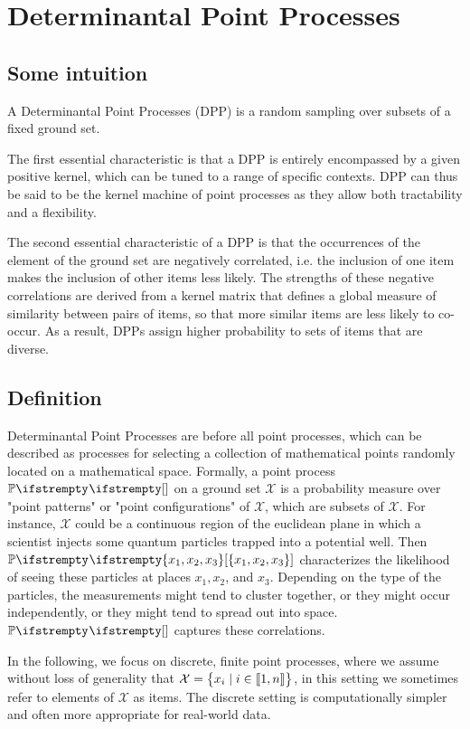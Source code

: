 \chapter{Determinantal Point Processes}

\section{Some intuition}

A Determinantal Point Processes (DPP) is a random sampling over subsets of a fixed ground set. 

The first essential characteristic is that a DPP is entirely encompassed by a given positive kernel, which can be tuned to a range of specific contexts. DPP can thus be said to be the kernel machine of point processes as they allow both tractability and a flexibility. 

The second essential characteristic of a DPP is that the occurrences of the element of the ground set are negatively correlated, i.e. the inclusion of one item
makes the inclusion of other items less likely. The strengths of these negative correlations are derived from a kernel matrix that defines a global measure of similarity between pairs of items, so that more similar items are less likely to co-occur. As a result, DPPs assign higher probability to sets of items that are diverse.




\section{Definition}
Determinantal Point Processes are before all point processes, which can be described as processes for selecting a collection of mathematical points randomly located on a mathematical space. Formally, a point process $\PP{}{}$ on a ground set $\mathcal{X}$ is a probability measure over "point patterns" or "point configurations" of $\mathcal{X}$, which are subsets of $\mathcal{X}$. For instance, $\mathcal{X}$ could be a continuous region of the euclidean plane in which a scientist injects some quantum particles trapped into a potential well. Then $\PP{}{\left\{x_1, x_2, x_3\right\}}$ characterizes the likelihood of seeing these particles at places $x_1, x_2$, and $x_3$. Depending on the type of the particles, the measurements might tend to cluster together, or they might occur independently, or they might tend to spread out into space. $\PP{}{}$ captures these correlations.

In the following, we focus on discrete, finite point processes, where we assume without loss of generality that $\mathcal{X}=\begin{Bmatrix}
    x_{i} \mid i\in \llbracket 1,n \rrbracket
    \end{Bmatrix}$, in this setting we sometimes refer to elements of $\mathcal{X}$ as items. The discrete setting is computationally simpler and often more appropriate for real-world data.

